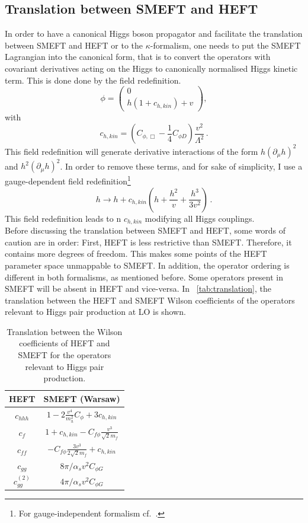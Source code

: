 \subsection{Translation between SMEFT and HEFT }
In order to have a canonical Higgs boson propagator and facilitate the translation between SMEFT and HEFT or to the $\kappa$-formalism, one needs to put the SMEFT Lagrangian into the canonical form, that is to convert the operators with covariant derivatives acting on the Higgs to canonically normalised Higgs kinetic term. This is done done by the field redefinition.
\begin{equation}
	\phi=\left( \begin{array}{c} 0 \\ h(1+c_{h,kin}) + v \end{array} \right),
\end{equation} 
with 
\begin{equation}
	c_{h,kin}=\left(C_{\phi,\Box}-\frac{1}{4}C_{\phi D}\right) \frac{v^2}{\Lambda^2}\,.
\end{equation}
This field redefinition will generate derivative interactions of the form $h(\partial_{\mu}h)^2$ and $h^2(\partial_{\mu}h)^2$. In order to remove these terms, and for sake of simplicity, I use a gauge-dependent field redefinition\footnote{For gauge-independent formalism cf.~\cite{Hartmann:2015aia}.}
\begin{equation}
	h \to h + c_{h,kin}\left( h +\frac{h^2}{v}+\frac{h^3}{3v^2}\right)\,. \label{fieldref}
\end{equation}
This field redefinition leads to n $c_{h,kin}$ modifying all Higgs couplings. \\
Before discussing the translation between SMEFT and HEFT, some words of caution are in order: First, HEFT is less restrictive than SMEFT. Therefore, it contains more degrees of freedom. This makes some points of the HEFT parameter space unmappable to SMEFT. In addition, the operator ordering is different in both formalisms, as mentioned before. Some operators present in SMEFT will be absent in HEFT and vice-versa.  In ~\autoref{tab:translation}, the translation between the HEFT and SMEFT Wilson coefficients of the operators relevant to Higgs pair production at LO is shown. 
\begin{table}[htb]
	\begin{center}
		\begin{tabular}{ c c }
			\toplinetwo
			HEFT& SMEFT (Warsaw)\\
			\midrule
			$c_{hhh}$&$1-2\frac{v^4}{m_h^2}C_\phi+3c_{h,kin}$ \\
			$c_f$ & $1+c_{h,kin} -C_{f\phi} \frac{v^3}{\sqrt{2} m_f}$\\
			$ c_{ff} $ &$-C_{f\phi} \frac{3 v^3}{2\sqrt{2} m_f} + c_{h,kin}$\\
			$c_{gg}$  & $8\pi/\alpha_s v^2 C_{\phi G}$ \\
			$c_{gg}^{(2)}$  & $4\pi/\alpha_s v^2 C_{\phi G}$ \\
			\bottomrule
		\end{tabular}
	\end{center}
	\caption{Translation between the Wilson coefficients of HEFT and SMEFT for the operators relevant to Higgs pair production. \label{tab:translation}}
\end{table}

